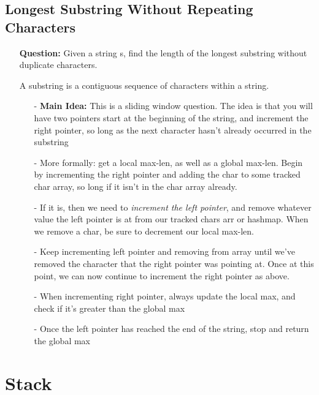 \documentclass[12pt]{article}
\begin{document}
\subsection{Longest Substring Without Repeating Characters}
\begin{enumerate}
  \item[] \textbf{Question:} Given a string s, find the length of the longest substring without duplicate characters.

A substring is a contiguous sequence of characters within a string.

    \begin{enumerate}
      \item[-] \textbf{Main Idea: } This is a sliding window question. The idea is that you will have two pointers start at the beginning of the string, and increment the right pointer, so long as the next character hasn't already occurred in the substring
      \item[-] More formally: get a local max-len, as well as a global max-len. Begin by incrementing the right pointer and adding the char to some tracked char array, so long if it isn't in the char array already. 
      \item[-] If it is, then we need to \textit{increment the left pointer}, and remove whatever value the left pointer is at from our tracked chars arr or hashmap. When we remove a char, be sure to decrement our local max-len.
      \item[-] Keep incrementing left pointer and removing from array until we've removed the character that the right pointer was pointing at. Once at this point, we can now continue to increment the right pointer as above. 
      \item[-] When incrementing right pointer, always update the local max, and check if it's greater than the global max
      \item[-] Once the left pointer has reached the end of the string, stop and return the global max
    \end{enumerate}
\end{enumerate}



\section{Stack}
\end{document}
